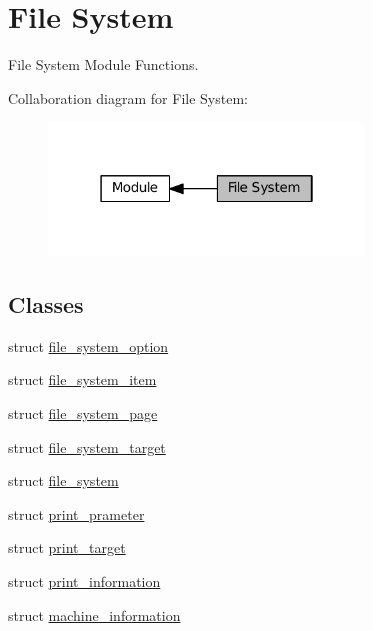 \hypertarget{group__MODULE__FILE__SYSTEM}{}\section{File System}
\label{group__MODULE__FILE__SYSTEM}


File System Module Functions.  


Collaboration diagram for File System\+:\nopagebreak
\begin{figure}[H]
\begin{center}
\leavevmode
\includegraphics[width=238pt]{group__MODULE__FILE__SYSTEM}
\end{center}
\end{figure}
\subsection*{Classes}
\begin{DoxyCompactItemize}
\item 
struct \hyperlink{structfile__system__option}{file\+\_\+system\+\_\+option}
\item 
struct \hyperlink{structfile__system__item}{file\+\_\+system\+\_\+item}
\item 
struct \hyperlink{structfile__system__page}{file\+\_\+system\+\_\+page}
\item 
struct \hyperlink{structfile__system__target}{file\+\_\+system\+\_\+target}
\item 
struct \hyperlink{structfile__system}{file\+\_\+system}
\item 
struct \hyperlink{structprint__prameter}{print\+\_\+prameter}
\item 
struct \hyperlink{structprint__target}{print\+\_\+target}
\item 
struct \hyperlink{structprint__information}{print\+\_\+information}
\item 
struct \hyperlink{structmachine__information}{machine\+\_\+information}
\end{DoxyCompactItemize}
